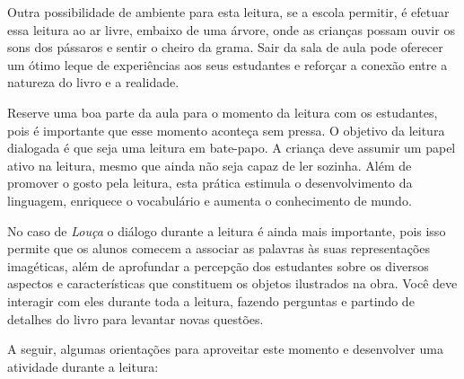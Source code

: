 \documentclass[11pt]{extarticle}
\begin{document}
Outra possibilidade de ambiente para esta leitura, se a escola permitir, 
é efetuar essa leitura ao ar livre, embaixo de uma árvore, onde as crianças 
possam ouvir os sons dos pássaros e sentir o cheiro da grama. Sair da sala 
de aula pode oferecer um ótimo leque de experiências aos seus estudantes e 
reforçar a conexão entre a natureza do livro e a realidade.  

Reserve uma boa parte da aula para o momento da leitura com os estudantes, 
pois é importante que esse momento aconteça sem pressa. O objetivo da 
leitura dialogada é que seja uma leitura em bate-papo. A criança deve 
assumir um papel ativo na leitura, mesmo que ainda não seja capaz de 
ler sozinha. Além de promover o gosto pela leitura, esta prática estimula 
o desenvolvimento da linguagem, enriquece o vocabulário e 
aumenta o conhecimento de mundo.

No caso de \textit{Louça} o diálogo durante a leitura é 
ainda mais importante, pois isso permite que os alunos comecem a associar as palavras às suas representações imagéticas, além de aprofundar a percepção dos estudantes sobre os diversos aspectos e características que constituem os objetos ilustrados na obra.
Você deve interagir com eles durante toda a 
leitura, fazendo perguntas e partindo de detalhes do livro para 
levantar novas questões. 

A seguir, algumas orientações para aproveitar este momento e desenvolver uma atividade durante a leitura: 
\end{document}
